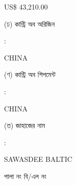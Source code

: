 \documentclass[12pt]{article}
\newcommand{\price}{US\$ 43,210.00}
\newcommand{\co}{CHINA}
\newcommand{\coship}{CHINA}
\newcommand{\vessel}{SAWASDEE BALTIC}
\begin{document}
\begin{minipage}[t]{0.53\linewidth}
{\price}
\\
\end{minipage}
\begin{minipage}[t]{0.05\linewidth}
\hspace*{1em}
\end{minipage}
\begin{minipage}[t]{0.40\linewidth}
(ঢ) কান্ট্রি অব অরিজিন
\end{minipage}
\begin{minipage}[t]{0.02\linewidth}
:
\end{minipage}
\begin{minipage}[t]{0.53\linewidth}
{\co}
\\
\end{minipage}
\begin{minipage}[t]{0.05\linewidth}
\hspace*{1em}
\end{minipage}
\begin{minipage}[t]{0.40\linewidth}
(ণ) কান্ট্রি অব শিপমেন্ট
\end{minipage}
\begin{minipage}[t]{0.02\linewidth}
:
\end{minipage}
\begin{minipage}[t]{0.53\linewidth}
{\coship}
\\
\end{minipage}
\begin{minipage}[t]{0.05\linewidth}
\hspace*{1em}
\end{minipage}
\begin{minipage}[t]{0.40\linewidth}
(ত) জাহাজের নাম
\end{minipage}
\begin{minipage}[t]{0.02\linewidth}
:
\end{minipage}
\begin{minipage}[t]{0.53\linewidth}
{\vessel}
\end{minipage}
\begin{minipage}[t]{0.05\linewidth}
\hspace*{1em}
\end{minipage}
\begin{minipage}[t]{0.40\linewidth}
\hspace*{1.8em}পালা নং বি/এল নং
\end{minipage}
\begin{minipage}[t]{0.02\linewidth}
\hspace{1em}
\end{minipage}
\end{document}
